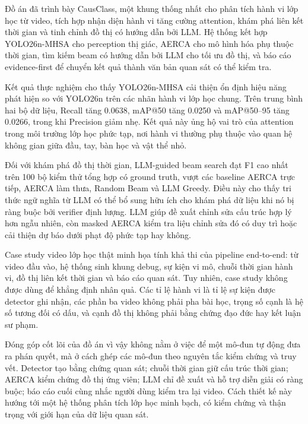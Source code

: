 Đồ án đã trình bày CausClass, một khung thống nhất cho phân tích hành vi lớp học từ video, tích hợp nhận diện hành vi tăng cường attention, khám phá liên kết thời gian và tinh chỉnh đồ thị có hướng dẫn bởi LLM. Hệ thống kết hợp YOLO26n-MHSA cho perception thị giác, AERCA cho mô hình hóa phụ thuộc thời gian, tìm kiếm beam có hướng dẫn bởi LLM cho tối ưu đồ thị, và báo cáo evidence-first để chuyển kết quả thành văn bản quan sát có thể kiểm tra.

Kết quả thực nghiệm cho thấy YOLO26n-MHSA cải thiện ổn định hiệu năng phát hiện so với YOLO26n trên các nhãn hành vi lớp học chung. Trên trung bình hai bộ dữ liệu, Recall tăng 0.0638, mAP@50 tăng 0.0250 và mAP@50--95 tăng 0.0266, trong khi Precision giảm nhẹ. Kết quả này ủng hộ vai trò của attention trong môi trường lớp học phức tạp, nơi hành vi thường phụ thuộc vào quan hệ không gian giữa đầu, tay, bàn học và vật thể nhỏ.

Đối với khám phá đồ thị thời gian, LLM-guided beam search đạt F1 cao nhất trên 100 bộ kiểm thử tổng hợp có ground truth, vượt các baseline AERCA trực tiếp, AERCA làm thưa, Random Beam và LLM Greedy. Điều này cho thấy tri thức ngữ nghĩa từ LLM có thể bổ sung hữu ích cho khám phá dữ liệu khi nó bị ràng buộc bởi verifier định lượng. LLM giúp đề xuất chỉnh sửa cấu trúc hợp lý hơn ngẫu nhiên, còn masked AERCA kiểm tra liệu chỉnh sửa đó có duy trì hoặc cải thiện dự báo dưới phạt độ phức tạp hay không.

Case study video lớp học thật minh họa tính khả thi của pipeline end-to-end: từ video đầu vào, hệ thống sinh khung debug, sự kiện vi mô, chuỗi thời gian hành vi, đồ thị liên kết thời gian và báo cáo quan sát. Tuy nhiên, case study không được dùng để khẳng định nhân quả. Các tỉ lệ hành vi là tỉ lệ sự kiện được detector ghi nhận, các phần ba video không phải pha bài học, trọng số cạnh là hệ số tương đối có dấu, và cạnh đồ thị không phải bằng chứng đạo đức hay kết luận sư phạm.

Đóng góp cốt lõi của đồ án vì vậy không nằm ở việc để một mô-đun tự động đưa ra phán quyết, mà ở cách ghép các mô-đun theo nguyên tắc kiểm chứng và truy vết. Detector tạo bằng chứng quan sát; chuỗi thời gian giữ cấu trúc thời gian; AERCA kiểm chứng đồ thị ứng viên; LLM chỉ đề xuất và hỗ trợ diễn giải có ràng buộc; báo cáo cuối cùng nhắc người dùng kiểm tra lại video. Cách thiết kế này hướng tới một hệ thống phân tích lớp học minh bạch, có kiểm chứng và thận trọng với giới hạn của dữ liệu quan sát.
